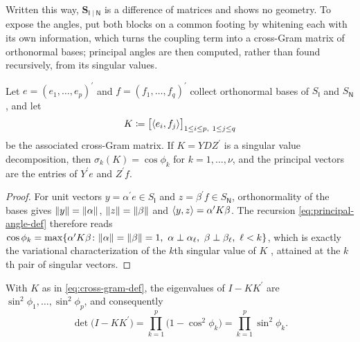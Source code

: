 \documentclass{IEEEtran}
\begin{document}
Written this way, $\mathbf{S}_{\mathsf{I}\mid\mathsf{N}}$ is a difference of matrices and shows no geometry. To expose the angles, put both blocks on a common footing by whitening each with its own information, which turns the coupling term into a cross-Gram matrix of orthonormal bases; principal angles are then computed, rather than found recursively, from its singular values.

\begin{lemma}\label{lem:cross-gram-angles}
  Let $e = (e_{1},\ldots,e_{p})^{\prime}$ and $f = (f_{1},\ldots,f_{q})^{\prime}$ collect orthonormal bases of $S_{\mathsf{I}}$ and $S_{\mathsf{N}}$, and let
  \begin{equation}
    K \coloneq \bigl[\langle e_{i}, f_{j}\rangle\bigr]_{1 \le i \le p,\ 1 \le j \le q}
    \label{eq:cross-gram-def}
  \end{equation}
  be the associated cross-Gram matrix. If $K = Y D Z^{\prime}$ is a singular value decomposition, then $\sigma_{k}(K) = \cos\phi_{k}$ for $k = 1,\ldots,\nu$, and the principal vectors are the entries of $Y^{\prime}e$ and $Z^{\prime}f$.
\end{lemma}

\begin{proof}
  For unit vectors $y = \alpha^{\prime}e \in S_{\mathsf{I}}$ and $z = \beta^{\prime}f \in S_{\mathsf{N}}$, orthonormality of the bases gives $\lVert y\rVert = \lVert\alpha\rVert$, $\lVert z\rVert = \lVert\beta\rVert$ and $\langle y,z\rangle = \alpha^{\prime}K\beta$. The recursion \eqref{eq:principal-angle-def} therefore reads $\cos\phi_{k} = \max\{\alpha^{\prime}K\beta \colon \lVert\alpha\rVert = \lVert\beta\rVert = 1,\
  \alpha \perp \alpha_{\ell},\ \beta \perp \beta_{\ell},\ \ell < k\}$, which is exactly the
  variational characterization of the $k$th singular value of $K$ \cite[Sec.~7.3]{horn2013}, attained at the $k$th pair of singular vectors.
\end{proof}

\begin{corollary}\label{cor:angle-determinant}
  With $K$ as in \eqref{eq:cross-gram-def}, the eigenvalues of $I - KK^{\prime}$ are $\sin^{2}\phi_{1}, \ldots, \sin^{2}\phi_{p}$, and consequently
  \begin{equation}
    \det\bigl(I - KK^{\prime}\bigr) = \prod_{k=1}^{p} \bigl(1 - \cos^{2}\phi_{k}\bigr)
    = \prod_{k=1}^{p} \sin^{2}\phi_{k}.
    \label{eq:angle-determinant}
  \end{equation}
\end{corollary}
\end{document}
